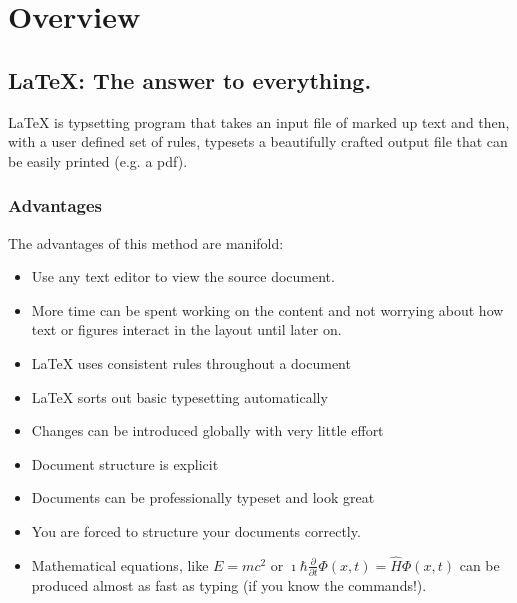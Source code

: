 \chapter{Overview}
\label{chap:overview}
\section{LaTeX: The answer to everything.}
LaTeX is typsetting program that takes an input file of marked up text and then, with a user defined set of rules, typesets a beautifully crafted output file that can be easily printed (e.g. a pdf). 

\subsection{Advantages}

The advantages of this method are manifold:

\begin{itemize}

\item Use any text editor to view the source document.
\item More time can be spent working on the content and not worrying about how text or figures interact in the layout until later on.
\item LaTeX uses consistent rules throughout a document
\item LaTeX sorts out basic typesetting automatically
\item Changes can be introduced globally with very little effort
\item Document structure is explicit
\item Documents can be professionally typeset and look great
\item You are forced to structure your documents correctly.
\item Mathematical equations, like $E=mc^2$ or $\imath\hbar\frac{\partial}{\partial t}\Phi (x, t) = \hat{H}\Phi (x, t)$ can be produced almost as fast as typing (if you know the commands!).
\end{itemize}

